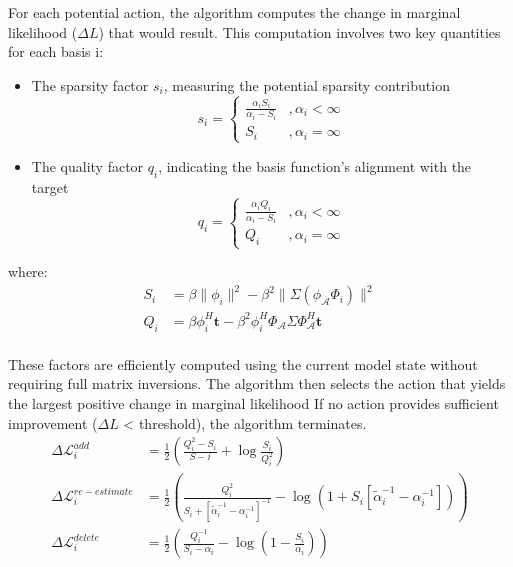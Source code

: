 \documentclass{article}
\begin{document}
For each potential action, the algorithm computes the change in marginal likelihood ($\Delta L$) that would result. This computation involves two key quantities for each basis i:
\begin{itemize}
\item The sparsity factor $s_i$, measuring the potential sparsity contribution
\begin{equation}
s_i = \begin{cases}
  \frac{\alpha_iS_i}{\alpha_i-S_i}       & , \alpha_i < \infty \\
  S_i         & , \alpha_i=\infty
\end{cases}
\end{equation}
\item The quality factor $q_i$, indicating the basis function's alignment with the target
\begin{equation}
    q_i = \begin{cases}
  \frac{\alpha_iQ_i}{\alpha_i-S_i}       & , \alpha_i < \infty \\
  Q_i         & , \alpha_i=\infty
\end{cases}
\end{equation}
\end{itemize}
where:
\begin{equation}
    \begin{split}
    S_i &= \beta \|\phi_i\|^2-\beta^2\|\Sigma(\phi_\mathcal{A}\Phi_i)\|^2 \\
    Q_i &= \beta\phi_i^H\boldsymbol{t}-\beta^2\phi_i^H\Phi_\mathcal{A}\Sigma\Phi_\mathcal{A}^H\boldsymbol{t} \\
    \end{split}
\end{equation}
    
These factors are efficiently computed using the current model state without requiring full matrix inversions. The algorithm then selects the action that yields the largest positive change in marginal likelihood If no action provides sufficient improvement ($\Delta L$ < threshold), the algorithm terminates.
\begin{equation}
\begin{split}
\Delta\mathcal{L}_i^{add} &= \frac{1}{2}\left(\frac{Q_i^2-S_i}{S-i}+\log\frac{S_i}{Q_i^2}\right) \\
\Delta\mathcal{L}_i^{re-estimate} &= \frac{1}{2}\left(\frac{Q_i^2}{S_i+[\tilde{\alpha}_i^{-1}-\alpha_i^{-1}]^{-1}}-\log(1+S_i[\tilde{\alpha}_i^{-1}-\alpha_i^{-1}])\right) \\
\Delta\mathcal{L}_i^{delete} &= \frac{1}{2}\left(\frac{Q_i^{-1}}{S_i-\alpha_i}-\log\left(1-\frac{S_i}{\alpha_i}\right)\right)
\end{split}
\end{equation}
\end{document}
